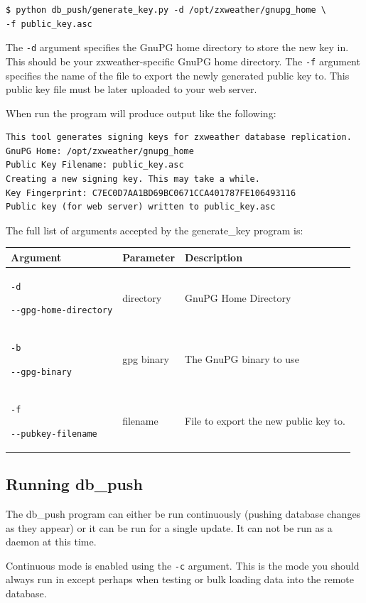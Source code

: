 \documentclass[a4paper,10pt,draft]{book}
\begin{document}
\begin{verbatim}
$ python db_push/generate_key.py -d /opt/zxweather/gnupg_home \
-f public_key.asc
\end{verbatim}

The \verb|-d| argument specifies the GnuPG home directory to store the new key in. This should be your zxweather-specific GnuPG home directory. The \verb|-f| argument specifies the name of the file to export the newly generated public key to. This public key file must be later uploaded to your web server.

When run the program will produce output like the following:
\begin{verbatim}
This tool generates signing keys for zxweather database replication.
GnuPG Home: /opt/zxweather/gnupg_home
Public Key Filename: public_key.asc
Creating a new signing key. This may take a while.
Key Fingerprint: C7EC0D7AA1BD69BC0671CCA401787FE106493116
Public key (for web server) written to public_key.asc
\end{verbatim}

The full list of arguments accepted by the generate\_key program is:

\begin{tabular}{p{4.2cm} l p{7.9cm}}
\hline
\textbf{Argument} & \textbf{Parameter} & \textbf{Description} \\
\hline

\verb|-d| \par \verb|--gpg-home-directory| & directory & GnuPG Home Directory \\

\verb|-b| \par \verb|--gpg-binary| & gpg binary & The GnuPG binary to use \\

\verb|-f| \par \verb|--pubkey-filename| & filename & File to export the new public key to. \\
\hline
\end{tabular}


\subsection{Running db\_push}

The db\_push program can either be run continuously (pushing database changes as they appear) or it can be run for a single update. It can not be run as a daemon at this time.

Continuous mode is enabled using the \verb|-c| argument. This is the mode you should always run in except perhaps when testing or bulk loading data into the remote database.
\end{document}
